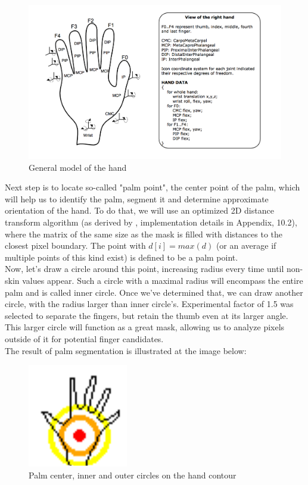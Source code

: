 \documentclass[a4paper,11pt,oneside]{article}
\begin{document}
  \begin{figure}[H]
  \centering
  \includegraphics[scale=0.47]{hand-dof.png}
\caption{General model of the hand}
\end{figure}

Next step is to locate so-called "palm point", the center point of the palm, which will help us to identify the palm, segment it and determine approximate orientation of the hand. To do that, we will use an optimized 2D distance transform algorithm (as derived by \cite{DT01}, implementation details in Appendix, 10.2), where the matrix of the same size as the mask is filled with distances to the closest pixel boundary. The point with $d[i] = max(d)$ (or an average if multiple points of this kind exist) is defined to be a palm point.\\

 Now, let's draw a circle around this point, increasing radius every time until non-skin values appear. Such a circle with a maximal radius will encompass the entire palm and is called inner circle. Once we've determined that, we can draw another circle, with the radius larger than inner circle's. Experimental factor of 1.5 was selected to separate the fingers, but retain the thumb even at its larger angle. This larger circle will function as a great mask, allowing us to analyze pixels outside of it for potential finger candidates.\\

The result of palm segmentation is illustrated at the image below:\\

  \begin{figure}[H]
  \centering
  \includegraphics[scale=1.5]{hand-circles.png}
\caption{Palm center, inner and outer circles on the hand contour}
\end{figure}
\end{document}
